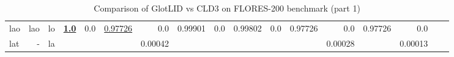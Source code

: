 \documentclass[11pt]{article}
\def\flores{FLORES\xspace}
\begin{document}
\begin{table*}[h]
{\begin{tabular}{lrrrrrrrrrrrrrrrr}
lao         & lao         & lo         & \textbf{\underline{1.0}}         & 0.0         & \underline{0.97726}         & 0.0         & 0.99901         & 0.0         & 0.99802         & 0.0         & 0.97726         & 0.0         & 0.97726         & 0.0         \\
lat         & -         & la         &          &          &          & 0.00042         &          &          &          &          &          & 0.00028         &          & 0.00013         \\
\end{tabular}
}
\caption{Comparison of GlotLID vs CLD3 on \flores-200 benchmark (part 1)}
\label{tab:appendix_glotlid_cld3_floress_1}
\end{table*}
 \begin{table*}[h]
\small
\centering
{}
\end{table*}
\end{document}
